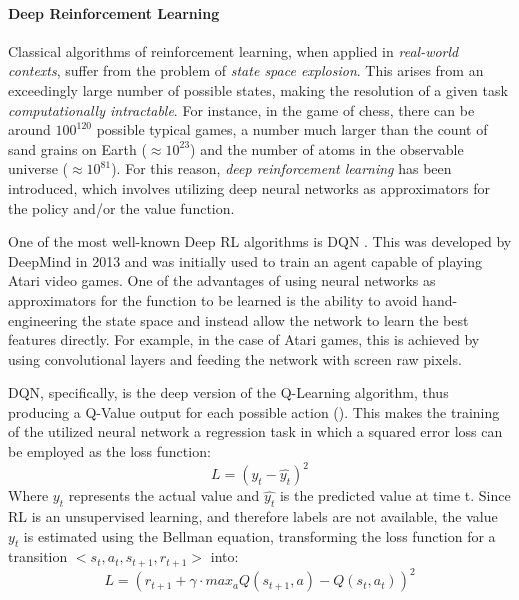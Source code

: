 \documentclass[12pt,a4paper,openright,twoside]{book}
\begin{document}
\paragraph{Deep Reinforcement Learning}

Classical algorithms of reinforcement learning, when applied in \emph{real-world contexts}, suffer from the problem of \emph{state space explosion}.
    This arises from an exceedingly large number of possible states, making the resolution of a given task \emph{computationally intractable}. 
    For instance, in the game of chess, there can be around $100^{120}$ possible typical games, a number much larger than 
    the count of sand grains on Earth ($\approx 10^{23}$) and the number of atoms in the observable universe 
    ($\approx 10^{81}$). 
    For this reason, \emph{deep reinforcement learning} has been introduced, which involves utilizing deep neural networks
    as approximators for the policy and/or the value function.

One of the most well-known Deep RL algorithms is DQN \cite{dqn}. This was developed by DeepMind in 2013 and was initially
    used to train an agent capable of playing Atari video games. One of the advantages of using neural networks as 
    approximators for the function to be learned is the ability to avoid hand-engineering the state space and instead 
    allow the network to learn the best features directly. For example, in the case of Atari games, this is achieved 
    by using convolutional layers and feeding the network with screen raw pixels.
    
DQN, specifically, is the deep version of the Q-Learning algorithm, thus producing a Q-Value output for each 
    possible action (). This makes the training of the utilized neural network a regression task 
    in which a squared error loss can be employed as the loss function:
    $$ L = (y_t - \hat{y_t})^2 $$
    Where $y_t$ represents the actual value and $\hat{y_t}$ is the predicted value at time t. Since RL is an 
    unsupervised learning, and therefore labels are not available, the value $y_t$ is estimated using the 
    Bellman equation, transforming the loss function for a transition $<s_t, a_t, s_{t+1}, r_{t+1}>$ into:
    $$ L = ( r_{t+1} + \gamma \cdot max_a Q(s_{t+1}, a) - Q(s_t, a_t))^2 $$
\end{document}
